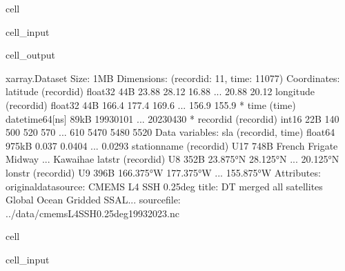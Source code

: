 \documentclass[letterpaper,10pt,english]{jupyterBook}
\begin{document}
\begin{sphinxuseclass}{cell}
\begin{sphinxVerbatimInput}
\begin{sphinxuseclass}{cell_input}
\begin{sphinxVerbatim}[commandchars=\\\{\}]
\end{sphinxVerbatim}

\end{sphinxuseclass}\end{sphinxVerbatimInput}
\begin{sphinxVerbatimOutput}

\begin{sphinxuseclass}{cell_output}
\begin{sphinxVerbatim}[commandchars=\\\{\}]
\PYGZlt{}xarray.Dataset\PYGZgt{} Size: 1MB
Dimensions:       (record\PYGZus{}id: 11, time: 11077)
Coordinates:
    latitude      (record\PYGZus{}id) float32 44B 23.88 28.12 16.88 ... 20.88 20.12
    longitude     (record\PYGZus{}id) float32 44B \PYGZhy{}166.4 \PYGZhy{}177.4 \PYGZhy{}169.6 ... \PYGZhy{}156.9 \PYGZhy{}155.9
  * time          (time) datetime64[ns] 89kB 1993\PYGZhy{}01\PYGZhy{}01 ... 2023\PYGZhy{}04\PYGZhy{}30
  * record\PYGZus{}id     (record\PYGZus{}id) int16 22B 140 500 520 570 ... 610 5470 5480 5520
Data variables:
    sla           (record\PYGZus{}id, time) float64 975kB \PYGZhy{}0.037 \PYGZhy{}0.0404 ... \PYGZhy{}0.0293
    station\PYGZus{}name  (record\PYGZus{}id) \PYGZlt{}U17 748B \PYGZsq{}French Frigate\PYGZsq{} \PYGZsq{}Midway\PYGZsq{} ... \PYGZsq{}Kawaihae\PYGZsq{}
    lat\PYGZus{}str       (record\PYGZus{}id) \PYGZlt{}U8 352B \PYGZsq{}23.875°N\PYGZsq{} \PYGZsq{}28.125°N\PYGZsq{} ... \PYGZsq{}20.125°N\PYGZsq{}
    lon\PYGZus{}str       (record\PYGZus{}id) \PYGZlt{}U9 396B \PYGZsq{}166.375°W\PYGZsq{} \PYGZsq{}177.375°W\PYGZsq{} ... \PYGZsq{}155.875°W\PYGZsq{}
Attributes:
    original\PYGZus{}data\PYGZus{}source:  CMEMS L4 SSH 0.25deg
    title:                 DT merged all satellites Global Ocean Gridded SSAL...
    source\PYGZus{}file:           ../data/cmems\PYGZus{}L4\PYGZus{}SSH\PYGZus{}0.25deg\PYGZus{}1993\PYGZus{}2023.nc
\end{sphinxVerbatim}

\end{sphinxuseclass}\end{sphinxVerbatimOutput}

\end{sphinxuseclass}
\begin{sphinxuseclass}{cell}\begin{sphinxVerbatimInput}

\begin{sphinxuseclass}{cell_input}
\begin{sphinxVerbatim}[commandchars=\\\{\}]
  
\end{sphinxVerbatim}

\end{sphinxuseclass}\end{sphinxVerbatimInput}

\end{sphinxuseclass}
\end{document}
